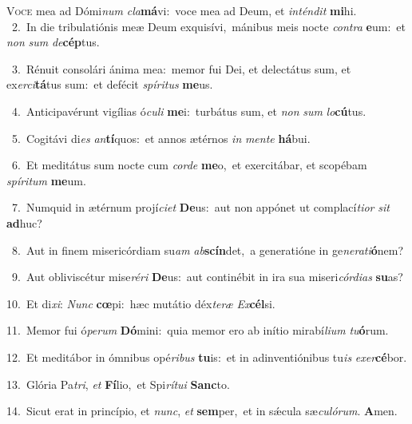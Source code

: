 \lettrine{\initial\textcolor{\initialcolor}{V}}{oce} mea ad Dómi\textit{num} \textit{cla}\-\textbf{má}vi:~\star voce mea ad Deum, et \textit{in}\-\textit{tén}\textit{dit} \textbf{mi}\-hi.\\
{\numbfont\textcolor{\numbcolor}{~2.}}~In die tribulatiónis meæ Deum exquisívi,~\dagger mánibus meis nocte \textit{con}\-\textit{tra} \textbf{e}\-um:~\star et \textit{non} \textit{sum} \textit{de}\-\textbf{cép}tus.\par
{\numbfont\textcolor{\numbcolor}{~3.}}~Rénuit consolári ánima mea:~\dagger memor fui Dei, et delectátus sum, et ex\-\textit{er}\-\textit{ci}\textbf{tá}tus sum:~\star et defécit \textit{spí}\-\textit{ri}\textit{tus} \textbf{me}\-us.\par
{\numbfont\textcolor{\numbcolor}{~4.}}~Anticipavérunt vigílias ó\-\textit{cu}\-\textit{li} \textbf{me}\-i:~\star turbátus sum, et \textit{non} \textit{sum} \textit{lo}\-\textbf{cú}tus.\par
{\numbfont\textcolor{\numbcolor}{~5.}}~Cogitávi di\textit{es} \textit{an}\-\textbf{tí}quos:~\star et annos ætérnos \textit{in} \textit{men}\-\textit{te} \textbf{há}\-bui.\par
{\numbfont\textcolor{\numbcolor}{~6.}}~Et meditátus sum nocte cum \textit{cor}\-\textit{de} \textbf{me}\-o,~\star et exercitábar, et scopébam \textit{spí}\-\textit{ri}\textit{tum} \textbf{me}\-um.\par
{\numbfont\textcolor{\numbcolor}{~7.}}~Numquid in ætérnum projí\-\textit{ci}\-\textit{et} \textbf{De}\-us:~\star aut non appónet ut complací\-\textit{ti}\-\textit{or} \textit{sit} \textbf{ad}\-huc?\par
{\numbfont\textcolor{\numbcolor}{~8.}}~Aut in finem misericórdiam su\textit{am} \textit{ab}\-\textbf{scín}det,~\star a generatióne in ge\-\textit{ne}\-\textit{ra}\textit{ti}\textbf{ó}nem?\par
{\numbfont\textcolor{\numbcolor}{~9.}}~Aut obliviscétur mise\-\textit{ré}\-\textit{ri} \textbf{De}\-us:~\star aut continébit in ira sua miseri\-\textit{cór}\-\textit{di}\textit{as} \textbf{su}\-as?\par
{\numbfont\textcolor{\numbcolor}{10.}}~Et di\-\textit{xi}\-: \textit{Nunc} \textbf{cœ}\-pi:~\star hæc mutátio déx\-\textit{te}\-\textit{ræ} \textit{Ex}\-\textbf{cél}si.\par
{\numbfont\textcolor{\numbcolor}{11.}}~Memor fui ó\-\textit{pe}\-\textit{rum} \textbf{Dó}\-mini:~\star quia memor ero ab inítio mirabí\-\textit{li}\-\textit{um} \textit{tu}\-\textbf{ó}rum.\par
{\numbfont\textcolor{\numbcolor}{12.}}~Et meditábor in ómnibus opé\-\textit{ri}\-\textit{bus} \textbf{tu}\-is:~\star et in adinventiónibus tu\textit{is} \textit{ex}\-\textit{er}\textbf{cé}bor.\par
{\numbfont\textcolor{\numbcolor}{13.}}~Glória Pa\-\textit{tri}\-, \textit{et} \textbf{Fí}\-lio,~\star et Spi\-\textit{rí}\-\textit{tu}\textit{i} \textbf{Sanc}\-to.\par
{\numbfont\textcolor{\numbcolor}{14.}}~Sicut erat in princípio, et \textit{nunc}\-, \textit{et} \textbf{sem}\-per,~\star et in sǽcula sæ\-\textit{cu}\-\textit{ló}\textit{rum}. \textbf{A}\-men.\par
